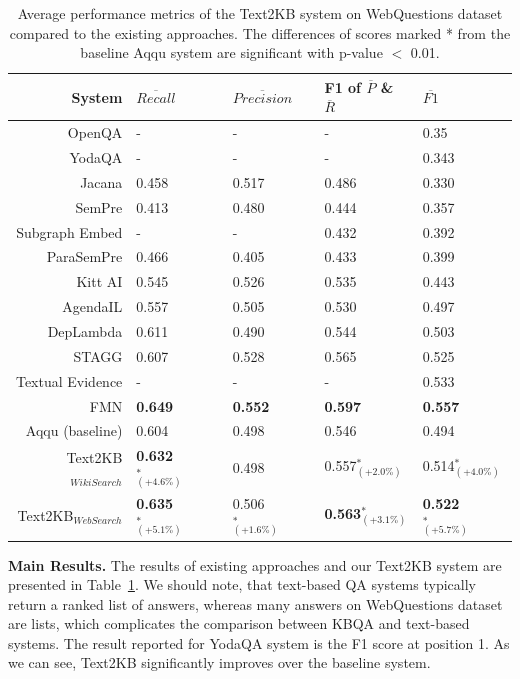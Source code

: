 \begin{table}[t]
\centering
\small
\begin{tabular}{rp{1.9cm}p{1.7cm}p{1.9cm}p{1.2cm} }
System & $\overline{Recall}$ & $\overline{Precision}$ & F1 of $\overline{P}$ \& $\overline{R}$ & $\overline{F1}$ \\
\hline
OpenQA \cite{Fader:2014:OQA:2623330.2623677} & - & - & - & 0.35 \\
YodaQA \cite{baudivs2015yodaqa} & - & - & - & 0.343 \\
\hline
Jacana \cite{YaoD14} & 0.458 & 0.517 & 0.486 & 0.330\\
SemPre \cite{BerantCFL13:sempre} & 0.413 & 0.480 & 0.444 & 0.357\\
Subgraph Embed \cite{BordesCW14:emnlp} & - & - & 0.432 & 0.392\\
ParaSemPre \cite{BerantL14:parasempre} & 0.466 & 0.405 & 0.433 & 0.399\\
Kitt AI \cite{yao-scratch-qa-naacl2015} & 0.545 & 0.526 & 0.535 & 0.443\\
AgendaIL \cite{berant2015imitation} & 0.557 & 0.505 & 0.530 & 0.497\\
DepLambda \cite{reddy2016transforming} & 0.611 & 0.490 & 0.544 & 0.503 \\
STAGG \cite{yih2014semantic} & 0.607 & 0.528 & 0.565 & 0.525\\
Textual Evidence\cite{xu2016enhancing} & - & - & - & 0.533 \\
FMN \cite{jain2016question} & \textbf{0.649} & \textbf{0.552} & \textbf{0.597} & \textbf{0.557}\\
\hline
Aqqu (baseline) \cite{bastmore:cikm:2015:aquu} & 0.604 & 0.498 & 0.546 & 0.494\\
Text2KB$_{Wiki Search}$ & \textbf{0.632}$_{(+4.6\%)}^*$  & 0.498 & 0.557$_{(+2.0\%)}^*$ & 0.514$_{(+4.0\%)}^*$ \\
Text2KB$_{Web Search}$ & \textbf{0.635}$_{(+5.1\%)}^*$ & 0.506$_{(+1.6\%)}^*$ & \textbf{0.563}$_{(+3.1\%)}^*$ & \textbf{0.522}$_{(+5.7\%)}^*$ \\
\end{tabular}
\caption{Average performance metrics of the Text2KB system on WebQuestions dataset compared to the existing approaches. The differences of scores marked * from the baseline Aqqu system are significant with p-value $<$ 0.01.}
\label{table:factoid:text2kb:webquestions_results}
\end{table}

\textbf{Main Results.}
The results of existing approaches and our Text2KB system are presented in Table~\ref{table:factoid:text2kb:webquestions_results}.
We should note, that text-based QA systems typically return a ranked list of answers, whereas many answers on WebQuestions dataset are lists, which complicates the comparison between KBQA and text-based systems.
The result reported for YodaQA system is the F1 score at position 1.
As we can see, Text2KB significantly improves over the baseline system.

